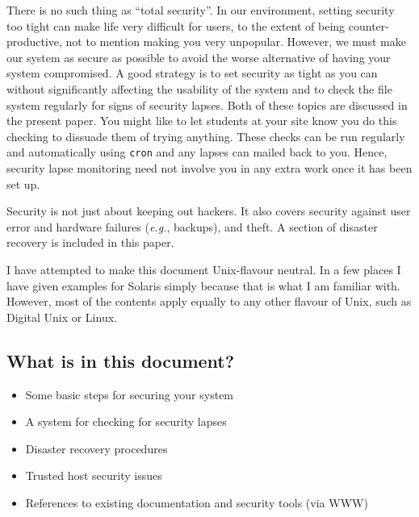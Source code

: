 \documentclass[11pt]{article}
\begin{document}
There is no such thing as ``total security''. In our environment,
setting security too tight can make life very difficult for users, to
the extent of being counter-productive, not to mention making you very
unpopular. However, we must make our system as secure as possible to
avoid the worse alternative of having your system compromised.  A good
strategy is to set security as tight as you can without significantly
affecting the usability of the system and to check the file system
regularly for signs of security lapses. Both of these topics are
discussed in the present paper. You might like to let students at your
site know you do this checking to dissuade them of trying anything.
These checks can be run regularly and automatically using {\tt cron}
and any lapses can mailed back to you. Hence, security lapse monitoring
need not involve you in any extra work once it has been set up.

Security is not just about keeping out hackers. It also covers security
against user error and hardware failures (\emph{e.g.}, backups), and theft.
A section of disaster recovery is included in this paper.

I have attempted to make this document Unix-flavour neutral. In a few
places I have given examples for Solaris simply because that is what I
am familiar with. However, most of the contents apply equally to any
other flavour of Unix, such as Digital Unix or Linux.


\subsection{What is in this document?}

\begin{itemize}
\item Some basic steps for securing your system
\item A system for checking for security lapses
\item Disaster recovery procedures
\item Trusted host security issues
\item References to existing documentation and security tools (via WWW)
\end{itemize}
\end{document}
